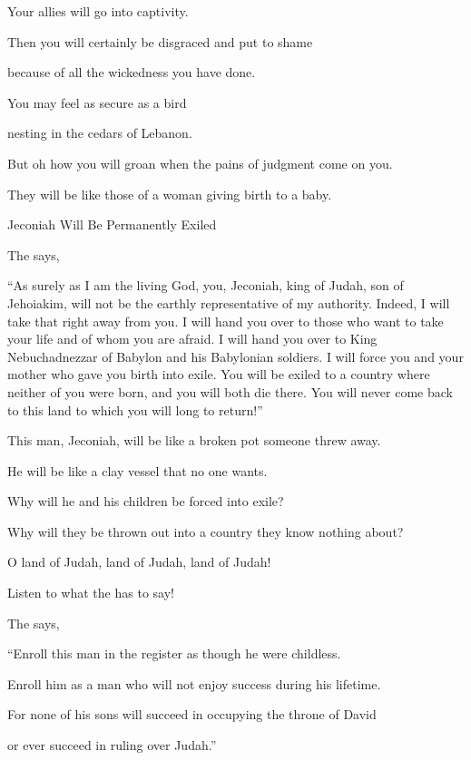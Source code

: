{\par }{\Q Your allies
will go
into captivity.
\par }{\Q Then
you will certainly
be disgraced
and put to shame
\par }{\Q because of all
the wickedness you have done.
\par }{\Q {}You may feel as secure
as a bird
\par }{\Q nesting
in
the cedars
of Lebanon.
\par }{\Q But oh how you
will groan when the pains
of judgment come
on
you.
\par }{\Q They will be like those of a woman giving birth to a baby.
\par }{\SH Jeconiah Will Be Permanently Exiled
\par }{\PP {}The
{}
says,
\par }{\PP “As surely
as I am
the living God, you, Jeconiah,
king
of Judah,
son
of Jehoiakim,
will not
be the earthly
representative
of my authority.
Indeed,
I will take that
right
away from you.
I will
hand
you over to those who want
to take your life
and of whom
you
are afraid.
I will hand
you over to King
Nebuchadnezzar
of Babylon
and his
Babylonian soldiers.
I will force
you and your mother
who
gave you birth
into exile.
You will be exiled
to a country
where
neither
of you were born,
and you will both die
there.
You will never
come back
to this
land
to which
you will long
to return!”
\par }{\Q {}This
man,
Jeconiah,
will be like a broken pot someone
threw
away.
\par }{\Q He will be like a clay vessel
that no
one wants.
\par }{\Q Why
will
he
and his children
be forced into exile?
\par }{\Q Why will
they be thrown
out into a country
they know
nothing about?
\par }{\Q {}O land
of Judah, land
of Judah, land
of Judah!

\par }{\Q Listen
to what
the
{} has to say!
\par }{\PP {}The
{}
says,
\par }{\Q “Enroll
this
man
in the register
as though he were childless.
\par }{\Q Enroll him as a man
who will not
enjoy success
during his lifetime.
\par }{\Q For
none of his sons will succeed
in occupying
the throne
of David
\par }{\Q or ever
succeed
in
ruling
over Judah.”

}
